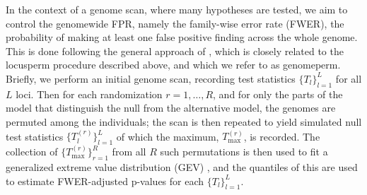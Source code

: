   In the context of a genome scan, where many hypotheses are tested, we aim to control the genomewide 
  FPR, namely the family-wise error rate (FWER), the probability of making at least one false positive finding across the whole genome.
  This is done following the general approach of \citet{Churchill1994}, which is closely related to the locusperm procedure described above, and which we refer to as genomeperm.
  Briefly, we perform an initial genome scan, recording test statistics $\{T_l\}_{l=1}^{L}$ for all $L$ loci.
  Then for each randomization $r=1,\dots,R$, and for only the parts of the model that distinguish the null from the alternative model, the genomes are permuted among the individuals; the scan is then repeated to yield simulated null test statistics $\{T^{(r)}_l\}_{l=1}^{L}$ of which the maximum, $T^{(r)}_\text{max}$, is recorded.
  The collection of $\{T^{(r)}_\text{max}\}^R_{r=1}$ from all $R$ such permutations is then used to fit a generalized extreme value distribution (GEV) \citep{Dudbridge2004}, and the quantiles of this are used to estimate FWER-adjusted p-values for each $\{T_l\}_{l=1}^L$.

 



